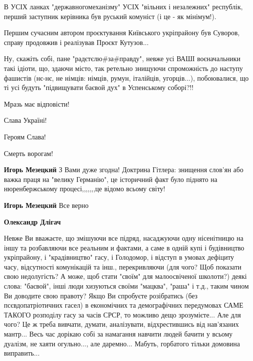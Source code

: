 \begin{itemize}
\begin{itemize}
\begin{itemize}
В УСІХ ланках "державногомеханізму" УСІХ "вільних і незалежних" республік,
перший заступник керівника був руський комуніст (і це - як мінімум!).

Першим сучасним автором проєктування Київського укріпрайону був Суворов, справу
продовжив і реалізував Проєкт Кутузов...

Ну, скажіть собі, пане "радєтєлю\#за\#правду", невже усі ВАШІ воєначальники такі
ідіоти, що, здаючи місто, так ретельно знищуючи спроможність до наступу
фашистів (нє-нє, не німців: німців, румун, італійців, угорців...), побоювалися,
що ті усі будуть "підвищувати баєвой дух" в Успенському соборі?!!

Мразь має відповісти!

Слава Україні!

Героям Слава!

Смерть ворогам!

 
\textbf{Игорь Мезецкий} З Вами дуже згодна! Доктрина Гітлера: знищення слов'ян
або важка праця на "велику Германію", це історичний факт було піднято на
нюренбержському процесі,,,,,,,це відомо всьому світу!


 
\textbf{Игорь Мезецкий} Все верно


 
\textbf{Олександр Длігач} 

Невже Ви вважаєте, що змішуючи все підряд, насаджуючи
одну нісенітницю на іншу та розбавляючи все реальним и фактами, а саме в одній
купі і будівництво укріпрайону, і "крадівництво" гасу, і Голодомор, і відступ в
умовах дефіциту часу, відсутності комунікацій та інш., перекривляючи (для чого?
Щоб показати свою недолугість? А може, щоб стати "своїм" для малоосвіченої
школоти?) деякі слова: "баєвой", інші люди хизуються своїми "мацква", "раша" і
т.д., таким чином Ви доводите свою правоту? Якщо Ви спробуєте розібратись (без
псєвдопатріотичних гасел) в економічних та демографічних передумовах САМЕ
ТАКОГО розподілу гасу за часів СРСР, то можливо дещо зрозумієте... Але для
чого? Це ж треба вивчати, думати, аналізувати, відхрестившись від нав'язаних
мантр... Весь час дорікаю собі за намагання навчити людей бачити у всьому
дуалізм, не хаяти огульно..., але даремно... Мабуть, горбатого тільки домовина
виправить...


\end{itemize}
\end{itemize}
\end{itemize}
